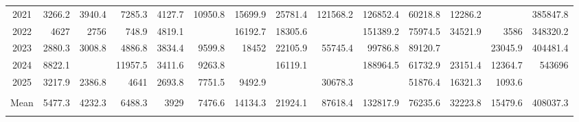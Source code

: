\begin{longtable}[t]{crrrrrrrrrrrrr}
2021 & 3266.2 & 3940.4 & 7285.3 & 4127.7 & 10950.8 & 15699.9 & 25781.4 & 121568.2 & 126852.4 & 60218.8 & 12286.2 & \cellcolor{green}{-6129.5} & 385847.8\\
2022 & 4627 & 2756 & 748.9 & 4819.1 & \cellcolor{red}{12810.4} & 16192.7 & 18305.6 & \cellcolor{green}{22589} & 151389.2 & 75974.5 & 34521.9 & 3586 & 348320.2\\
2023 & 2880.3 & 3008.8 & 4886.8 & 3834.4 & 9599.8 & 18452 & 22105.9 & 55745.4 & 99786.8 & 89120.7 & \cellcolor{red}{72014.7} & 23045.9 & 404481.4\\
2024 & 8822.1 & \cellcolor{red}{11378.1} & 11957.5 & 3411.6 & 9263.8 & \cellcolor{red}{25166.9} & 16119.1 & \cellcolor{red}{171363.6} & 188964.5 & 61732.9 & 23151.4 & 12364.7 & 543696\\
2025 & 3217.9 & 2386.8 & 4641 & 2693.8 & 7751.5 & 9492.9 & \cellcolor{green}{15908.1} & 30678.3 & \cellcolor{green}{35795.4} & 51876.4 & 16321.3 & 1093.6 & \cellcolor{green}{181857}\\
\midrule
\cellcolor{red}{Max} & \cellcolor{red}{12777.8} & \cellcolor{red}{11378.1} & \cellcolor{red}{19345.2} & \cellcolor{red}{5876.4} & \cellcolor{red}{12810.4} & \cellcolor{red}{25166.9} & \cellcolor{red}{30358} & \cellcolor{red}{171363.6} & \cellcolor{red}{211812.7} & \cellcolor{red}{132246.5} & \cellcolor{red}{72014.7} & \cellcolor{red}{62302.6} & \cellcolor{red}{577206.5}\\
Mean & 5477.3 & 4232.3 & 6488.3 & 3929 & 7476.6 & 14134.3 & 21924.1 & 87618.4 & 132817.9 & 76235.6 & 32223.8 & 15479.6 & 408037.3\\
\cellcolor{green}{Min} & \cellcolor{green}{-2206.5} & \cellcolor{green}{558.2} & \cellcolor{green}{215.7} & \cellcolor{green}{2579.2} & \cellcolor{green}{3782.1} & \cellcolor{green}{8603} & \cellcolor{green}{15908.1} & \cellcolor{green}{22589} & \cellcolor{green}{35795.4} & \cellcolor{green}{38441.5} & \cellcolor{green}{12230} & \cellcolor{green}{-6129.5} & \cellcolor{green}{181857}\\*
\end{longtable}
